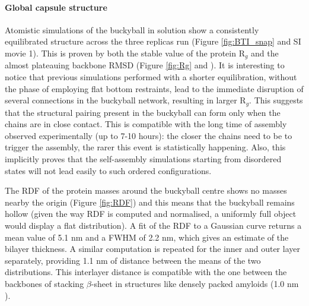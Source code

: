 \paragraph{Global capsule structure} Atomistic simulations of the buckyball in solution show a consistently equilibrated structure across the three replicas run (Figure \ref{fig:BTI_snap} and SI movie 1).
%
This is proven by both the stable value of the protein R$_g$ and the almost plateauing backbone RMSD (Figure \ref{fig:Rg} and ). It is interesting to notice that previous simulations performed with a shorter equilibration, without the phase of employing flat bottom restraints, lead to the immediate disruption of several connections in the buckyball network, resulting in larger R$_g$. This suggests that the structural pairing present in the buckyball can form only when the chains are in close contact. This is compatible with the long time of assembly observed experimentally (up to 7-10 hours): the closer the chains need to be to trigger the assembly, the rarer this event is statistically happening. Also, this implicitly proves that the self-assembly simulations starting from disordered states will not lead easily to such ordered configurations.

The RDF of the protein masses around the buckyball centre shows no masses nearby the origin (Figure \ref{fig:RDF}) and this means that the buckyball remains hollow (given the way RDF is computed and normalised, a uniformly full object would display a flat distribution).
%
A fit of the RDF to a Gaussian curve returns a mean value of 5.1 nm and a FWHM of 2.2 nm, which gives an estimate of the bilayer thickness.
%
A similar computation is repeated for the inner and outer layer separately, providing 1.1 nm of distance between the means of the two distributions. This interlayer distance is compatible with the one between the backbones of stacking $\beta$-sheet in structures like densely packed amyloids (1.0 nm \citep{Sunde1997}).

